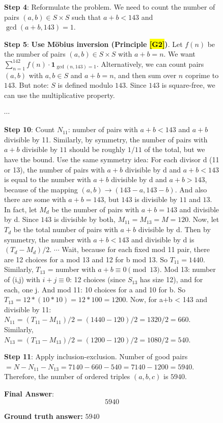 \documentclass{article}
\theoremstyle{plain}
\theoremstyle{definition}
\theoremstyle{remark}
\begin{document}
\begin{figure}[!tb]
\begin{runcard}[title={Example of How E-SPL Shapes Model Behavior}]
\begin{runbox}[title={Model Output}]
\textbf{Step 4}: Reformulate the problem. We need to count the number of pairs \( (a, b) \in S \times S \) such that \( a + b < 143 \) and \( \gcd(a+b, 143) = 1 \).

\medskip
\textbf{Step 5}: {\color{Brown}\textbf{Use Möbius inversion (Principle \hl{[G2]})}. Let \( f(n) \) be the number of pairs \( (a, b) \in S \times S \) with \( a + b = n \). We want \( \sum_{n=1}^{142} f(n) \cdot \mathbf{1}_{\gcd(n,143)=1} \). Alternatively, we can count pairs \( (a, b) \) with \( a, b \in S \) and \( a + b = n \), and then sum over \( n \) coprime to $143$. But note: \( S \) is defined modulo $143$. Since $143$ is square-free, we can use the multiplicative property.}

\quad $\cdots$

\textbf{Step 10}: Count \( N_{11} \): number of pairs with \( a+b < 143 \) and \( a+b \) divisible by 11. Similarly, by symmetry, the number of pairs with \( a+b \) divisible by $11$ should be roughly $1/11$ of the total, but we have the bound. Use the same symmetry idea: For each divisor d (11 or 13), the number of pairs with \( a+b \) divisible by d and \( a+b < 143 \) is equal to the number with \( a+b \) divisible by d and \( a+b > 143 \), because of the mapping \( (a,b) \to (143-a,143-b) \). And also there are some with \( a+b = 143 \), but $143$ is divisible by $11$ and $13$. In fact, let \( M_d \) be the number of pairs with \( a+b = 143 \) and divisible by d. Since $143$ is divisible by both, \( M_{11} = M_{13} = M = 120 \). Now, let \( T_d \) be the total number of pairs with \( a+b \) divisible by d. Then by symmetry, the number with \( a+b < 143 \) and divisible by d is \( (T_d - M_d)/2 \). \quad $\cdots$ \quad Wait, because for each fixed mod 11 pair, there are 12 choices for a mod 13 and 12 for b mod 13. So $T_{11} = 1440$. Similarly, $T_{13}$ = number with $a+b \equiv 0 \pmod{13}$. Mod 13: number of (i,j) with $i+j\equiv 0$: 12 choices (since $S_{13}$ has size 12), and for each, one j. And mod 11: 10 choices for a and 10 for b. So $T_{13} = 12 * (10*10) = 12*100 = 1200$. Now, for a+b < 143 and divisible by 11: $N_{11} = (T_{11} - M_{11})/2 = (1440 - 120)/2 = 1320/2 = 660$. Similarly, $N_{13} = (T_{13} - M_{13})/2 = (1200 - 120)/2 = 1080/2 = 540$.

\textbf{Step 11}: Apply inclusion-exclusion. Number of good pairs $= N - N_{11} - N_{13} = 7140 - 660 - 540 = 7140 - 1200 = 5940$. Therefore, the number of ordered triples $(a,b,c)$ is $5940$.

\medskip
\textbf{Final Answer}:
\[
\boxed{5940}
\]

\end{runbox}

\textbf{Ground truth answer:} $5940$
\end{runcard}
\label{tab:example-e-spl-4}

\end{figure}
\end{document}
